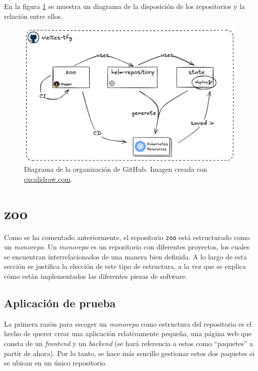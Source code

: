 En la figura \ref{fig:ghorg} se muestra un diagrama de la disposición de los repositorios y la relación entre ellos.

\begin{figure}[h]
  \centerline{\includegraphics[width=14cm]{figuras/vieites-tfg}}
  \caption{Diagrama de la organización de GitHub. Imagen creada con \href{https://excalidraw.com}{excalidraw.com}.}
  \label{fig:ghorg}
\end{figure}

\section{zoo}

Como se ha comentado anteriormente, el repositorio \texttt{zoo} está estructurado como un \textit{monorepo}. Un \textit{monorepo} es un repositorio con diferentes proyectos, los cuales se encuentran interrelacionados de una manera bien definida. A lo largo de esta sección se justifica la elección de este tipo de estructura, a la vez que se explica cómo están implementados las diferentes piezas de software.

\subsection*{Aplicación de prueba}

La primera razón para escoger un \textit{monorepo} como estructura del repositorio es el hecho de querer crear una aplicación relativamente pequeña, una página web que consta de un \textit{frontend} y un \textit{backend} (se hará referencia a estos como ``paquetes'' a partir de ahora). Por lo tanto, se hace más sencillo gestionar estos dos paquetes si se ubican en un único repositorio.

